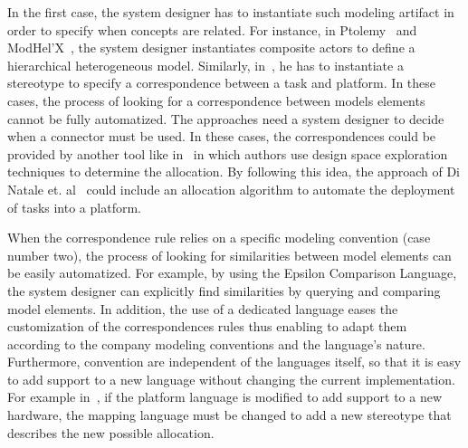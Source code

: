 In the first case, the system designer has to instantiate such modeling artifact in order to specify when concepts are related. For instance, in Ptolemy~\cite{ptoleframebib} and ModHel'X~\cite{modhelxbib}, the system designer instantiates composite actors to define a hierarchical heterogeneous model. Similarly, in~\cite{dinatale}, he has to instantiate a stereotype to specify a correspondence between a task and platform. In these cases, the process of looking for a correspondence between models elements cannot be fully automatized. The approaches need a system designer to decide when a connector must be used. In these cases, the correspondences could be provided by another tool like in~\cite{kofmanbib} in which authors use design space exploration techniques to determine the allocation. By following this idea, the approach of Di Natale et. al~\cite{dinatale} could include an allocation algorithm to automate the deployment of tasks into a platform. 

When the correspondence rule relies on a specific modeling convention (case number two), the process of looking for similarities between model elements can be easily automatized. For example, by using the Epsilon Comparison Language, the system designer can explicitly find similarities by querying and comparing model elements. In addition, the use of a dedicated language eases the customization of the correspondences rules thus enabling to adapt them according to the company modeling conventions and the language's nature. Furthermore, convention are independent of the languages itself, so that it is easy to add support to a new language without changing the current implementation. For example in~\cite{dinatale}, if the platform language is modified to add support to a new hardware, the mapping language must be changed to add a new stereotype that describes the new possible allocation. 
			
			
			
						 
							
